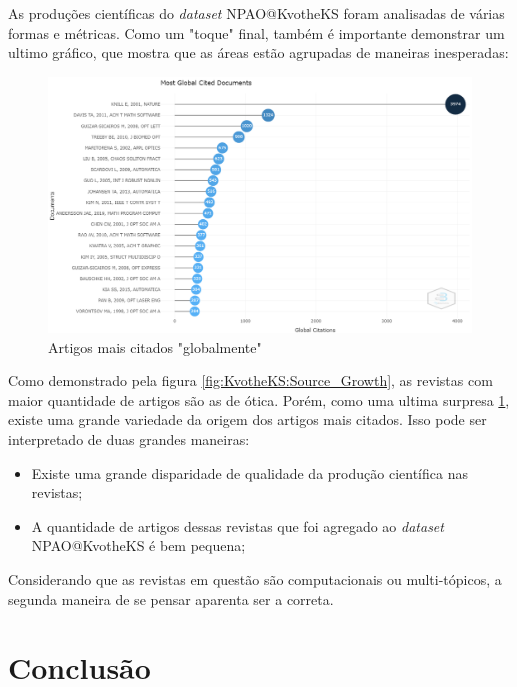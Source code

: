     As produções científicas do \emph{dataset} NPAO@KvotheKS foram analisadas de várias formas e métricas. Como um "toque" final, também é importante demonstrar um ultimo gráfico, que mostra que as áreas estão agrupadas de maneiras inesperadas:
    
    \begin{figure}[H]
        \centering
        \includegraphics[width=1\textwidth]{experiments/KvotheKS/PesqBibliogr/AlgoritmosSimulacaoOptica-Dinamica/WoS-20220202/Bibliometric/Documents/Most_cited_documents.png}
        \caption{Artigos mais citados "globalmente"}
        \label{fig:KvotheKS:Most_cited_docum}
    \end{figure}
    
    Como demonstrado pela figura \ref{fig:KvotheKS:Source_Growth}, as revistas com maior quantidade de artigos são as de ótica. Porém, como uma ultima surpresa \ref{fig:KvotheKS:Most_cited_docum}, existe uma grande variedade da origem dos artigos mais citados. Isso pode ser interpretado de duas grandes maneiras:
    
    \begin{itemize}
        \item Existe uma grande disparidade de qualidade da produção científica nas revistas;
        \item A quantidade de artigos dessas revistas que foi agregado ao \emph{dataset} NPAO@KvotheKS é bem pequena;
    \end{itemize}
    
    Considerando que as revistas em questão são computacionais ou multi-tópicos, a segunda maneira de se pensar aparenta ser a correta.
    
    \section{Conclusão}
    
